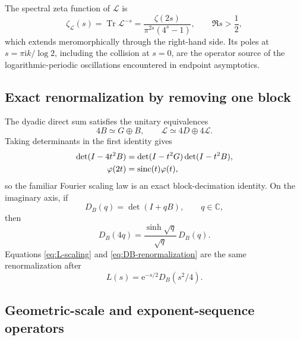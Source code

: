 \documentclass[11pt,oneside]{article}
\theoremstyle{definition}
\newcommand{\e}{\mathrm e}
\newcommand{\ii}{\mathrm i}
\newcommand{\C}{\mathbb C}
\newcommand{\sinc}{\operatorname{sinc}}
\newcommand{\Tr}{\operatorname{Tr}}
\newcommand{\phiF}{\varphi}
\begin{document}
The spectral zeta function of \(\mathscr L\) is
\begin{equation}
 \zeta_{\mathscr L}(s)=\Tr\mathscr L^{-s}
 =\frac{\zeta(2s)}{\pi^{2s}(4^s-1)},
 \qquad \Re s>\frac12,
 \label{eq:L-spectral-zeta}
\end{equation}
which extends meromorphically through the right-hand side.  Its poles at
\(s=\pi\ii k/\log2\), including the collision at \(s=0\), are the operator source of
the logarithmic-periodic oscillations encountered in endpoint asymptotics.

\subsection{Exact renormalization by removing one block}

The dyadic direct sum satisfies the unitary equivalences
\begin{equation}
 4B\simeq G\oplus B,
 \qquad
 \mathscr L\simeq4D\oplus4\mathscr L.
 \label{eq:operator-renormalization}
\end{equation}
Taking determinants in the first identity gives
\begin{align}
 \det(I-4t^2B)
 &=\det(I-t^2G)\det(I-t^2B),\notag\\
 \phiF(2t)&=\sinc(t)\phiF(t),
 \label{eq:det-renormalization}
\end{align}
so the familiar Fourier scaling law is an exact block-decimation identity.  On the
imaginary axis, if
\begin{equation}
 D_B(q)=\det(I+qB),\qquad q\in\C,
 \label{eq:DB}
\end{equation}
then
\begin{equation}
 D_B(4q)=\frac{\sinh\sqrt q}{\sqrt q}\,D_B(q).
 \label{eq:DB-renormalization}
\end{equation}
Equations \eqref{eq:L-scaling} and \eqref{eq:DB-renormalization} are the same
renormalization after
\begin{equation}
 L(s)=\e^{-s/2}D_B(s^2/4).
 \label{eq:L-DB}
\end{equation}

\subsection{Geometric-scale and exponent-sequence operators}
\label{sec:operator-generalization}
\end{document}
